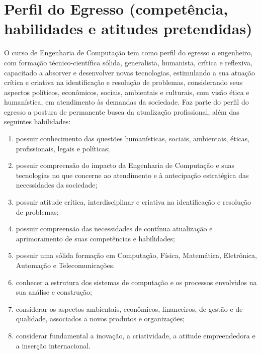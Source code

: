 \section{Perfil do Egresso (competência, habilidades e atitudes pretendidas)}
O curso de Engenharia de Computação tem como perfil do egresso o engenheiro, com formação técnico-científica sólida, generalista, humanista, crítica e reflexiva, capacitado a absorver e desenvolver novas tecnologias, estimulando a sua atuação crítica e criativa na identificação e resolução de problemas, considerando seus aspectos políticos, econômicos, sociais, ambientais e culturais, com visão ética e humanística, em atendimento às demandas da sociedade. Faz parte do perfil do egresso a postura de permanente busca da atualização profissional, além das seguintes habilidades:
\begin{enumerate} [I -]
	\item possuir conhecimento das questões humanísticas, sociais, ambientais, éticas, profissionais, legais e políticas;
	\item possuir compreensão do impacto da Engenharia de Computação e suas tecnologias no que concerne ao atendimento e à antecipação estratégica das necessidades da sociedade;
	\item possuir atitude crítica, interdisciplinar e criativa na identificação e resolução de problemas;
	\item possuir compreensão das necessidades de contínua atualização e aprimoramento de suas competências e habilidades;
	\item possuir uma sólida formação em Computação, Física, Matemática, Eletrônica, Automação e Telecomunicações.
	\item conhecer a estrutura dos sistemas de computação e os processos envolvidos na sua análise e construção;
	\item considerar os aspectos ambientais, econômicos, financeiros, de gestão e de qualidade, associados a novos produtos e organizações;
	\item considerar fundamental a inovação, a criatividade, a atitude empreendedora e a inserção internacional.
\end{enumerate}

